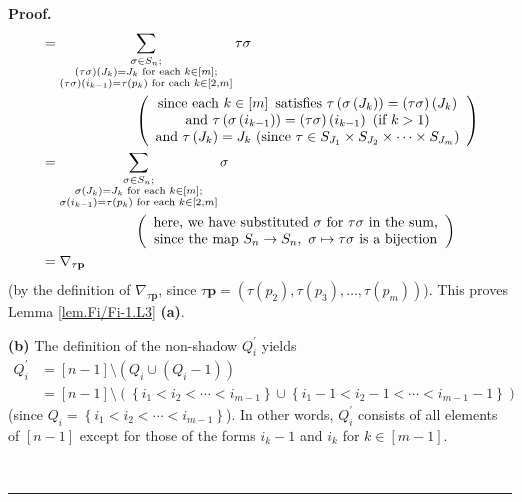 \documentclass[numbers=enddot,12pt,final,onecolumn,notitlepage]{scrartcl}%
\theoremstyle{definition}
\newenvironment{proof}[1][Proof]{\noindent\textbf{#1.} }{\ \rule{0.5em}{0.5em}}
\let\sumnonlimits\sum
\renewcommand{\sum}{\sumnonlimits\limits}
\begin{document}
\begin{proof}
\begin{align*}
&  =\sum_{\substack{\sigma\in S_{n};\\\left(  \tau\sigma\right)  \left(
J_{k}\right)  =J_{k}\text{ for each }k\in\left[  m\right]  ;\\\left(
\tau\sigma\right)  \left(  i_{k-1}\right)  =\tau\left(  p_{k}\right)  \text{
for each }k\in\left[  2,m\right]  }}\tau\sigma\\
&  \ \ \ \ \ \ \ \ \ \ \ \ \ \ \ \ \ \ \ \ \left(
\begin{array}
[c]{c}%
\text{since each }k\in\left[  m\right]  \text{ satisfies }\tau\left(
\sigma\left(  J_{k}\right)  \right)  =\left(  \tau\sigma\right)  \left(
J_{k}\right)  \\
\text{and }\tau\left(  \sigma\left(  i_{k-1}\right)  \right)  =\left(
\tau\sigma\right)  \left(  i_{k-1}\right)  \text{ (if }k>1\text{)}\\
\text{and }\tau\left(  J_{k}\right)  =J_{k}\text{ (since }\tau\in S_{J_{1}%
}\times S_{J_{2}}\times\cdots\times S_{J_{m}}\text{)}%
\end{array}
\right)  \\
&  =\sum_{\substack{\sigma\in S_{n};\\\sigma\left(  J_{k}\right)  =J_{k}\text{
for each }k\in\left[  m\right]  ;\\\sigma\left(  i_{k-1}\right)  =\tau\left(
p_{k}\right)  \text{ for each }k\in\left[  2,m\right]  }}\sigma\\
&  \ \ \ \ \ \ \ \ \ \ \ \ \ \ \ \ \ \ \ \ \left(
\begin{array}
[c]{c}%
\text{here, we have substituted }\sigma\text{ for }\tau\sigma\text{ in the
sum,}\\
\text{since the map }S_{n}\rightarrow S_{n},\ \sigma\mapsto\tau\sigma\text{ is
a bijection}%
\end{array}
\right)  \\
&  =\nabla_{\tau\mathbf{p}}%
\end{align*}
(by the definition of $\nabla_{\tau\mathbf{p}}$, since $\tau\mathbf{p}=\left(
\tau\left(  p_{2}\right)  ,\tau\left(  p_{3}\right)  ,\ldots,\tau\left(
p_{m}\right)  \right)  $). This proves Lemma \ref{lem.Fi/Fi-1.L3}
\textbf{(a)}. \medskip

\textbf{(b)} The definition of the non-shadow $Q_{i}^{\prime}$ yields%
\begin{align*}
Q_{i}^{\prime} &  =\left[  n-1\right]  \setminus\left(  Q_{i}\cup\left(
Q_{i}-1\right)  \right)  \\
&  =\left[  n-1\right]  \setminus\left(  \left\{  i_{1}<i_{2}<\cdots
<i_{m-1}\right\}  \cup\left\{  i_{1}-1<i_{2}-1<\cdots<i_{m-1}-1\right\}
\right)
\end{align*}
(since $Q_{i}=\left\{  i_{1}<i_{2}<\cdots<i_{m-1}\right\}  $). In other words,
$Q_{i}^{\prime}$ consists of all elements of $\left[  n-1\right]  $ except for
those of the forms $i_{k}-1$ and $i_{k}$ for $k\in\left[  m-1\right]  $.


\end{proof}
\end{document}
